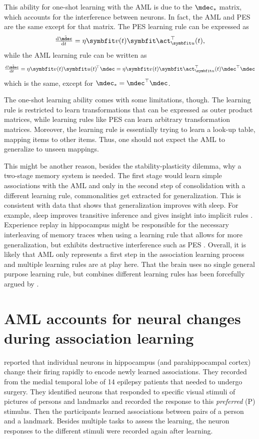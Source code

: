 This ability for one-shot learning with the AML is due to the $\mdec_*$ matrix, which accounts for the interference between neurons.
In fact, the AML and PES are the same except for that matrix.
The PES learning rule can be expressed as
\begin{equation}
    \od{\tilde{\mdec}}{t} = \eta \vc v(t) \vc\act_{\vc u}\Tr(t) \text{,}
\end{equation}
while the AML learning rule can be written as
\begin{equation}
    \od{\tilde{\mdec}}{t} = \eta \vc v(t) \vc u(t)\!\Tr \mdec = \eta \vc v(t) \vc\act_{\vc u}\Tr(t) \mdec\Tr \mdec
\end{equation}
which is the same, except for $\mdec_* = \mdec\Tr \mdec$.

The one-shot learning ability comes with some limitations, though.
The learning rule is restricted to learn transformations that can be expressed as outer product matrices, while learning rules like PES can learn arbitrary transformation matrices.
Moreover, the learning rule is essentially trying to learn a look-up table, mapping items to other items.
Thus, one should not expect the AML to generalize to unseen mappings.

This might be another reason, besides the stability-plasticity dilemma, why a two-stage memory system is needed.
The first stage would learn simple associations with the AML and only in the second step of consolidation with a different learning rule, commonalities get extracted for generalization.
This is consistent with data that shows that generalization improves with sleep.
For example, sleep improves transitive inference \parencite{stickgold2013-2} and gives insight into implicit rules \parencite{wagner2004}.
Experience replay in hippocampus might be responsible for the necessary interleaving of memory traces when using a learning rule that allows for more generalization, but exhibits destructive interference such as PES \parencite{mcclelland1995-1,kumaran2016}.
Overall, it is likely that AML only represents a first step in the association learning process and multiple learning rules are at play here.
That the brain uses no single general purpose learning rule, but combines different learning rules has been forcefully argued by \textcite{gallistel2009}.


\section{AML accounts for neural changes during association learning}\label{sec:aml-neural}
\Textcite{ison2015} reported that individual neurons in hippocampus (and parahippocampal cortex) change their firing rapidly to encode newly learned associations.
They recorded from the medial temporal lobe of \num{14} epilepsy patients that needed to undergo surgery.
They identified neurons that responded to specific visual stimuli of pictures of persons and landmarks and recorded the response to this \emph{preferred} (P) stimulus.
Then the participants learned associations between pairs of a person and a landmark.
Besides multiple tasks to assess the learning, the neuron responses to the different stimuli were recorded again after learning.


